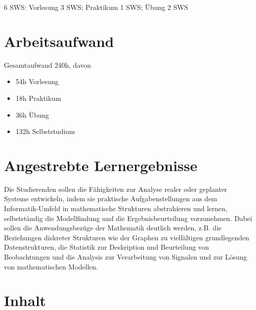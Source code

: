 6 SWS: Vorlesung 3 SWS; Praktikum 1 SWS; Übung 2 SWS

\hypertarget{arbeitsaufwandpathlabelmi-2017modulbeschreibungen-bachelorba_mathematik2}{%
\section*{Arbeitsaufwand\label{/mi-2017/modulbeschreibungen-bachelor/BA_Mathematik2}}\label{arbeitsaufwandpathlabelmi-2017modulbeschreibungen-bachelorba_mathematik2}}

Gesamtaufwand 240h, davon

\begin{itemize}
\tightlist
\item
  54h Vorlesung
\item
  18h Praktikum
\item
  36h Übung
\item
  132h Selbststudium
\end{itemize}

\hypertarget{angestrebte-lernergebnissepathlabelmi-2017modulbeschreibungen-bachelorba_mathematik2}{%
\section*{Angestrebte
Lernergebnisse\label{/mi-2017/modulbeschreibungen-bachelor/BA_Mathematik2}}\label{angestrebte-lernergebnissepathlabelmi-2017modulbeschreibungen-bachelorba_mathematik2}}

Die Studierenden sollen die Fähigkeiten zur Analyse realer oder
geplanter Systeme entwickeln, indem sie praktische Aufgabenstellungen
aus dem Informatik-Umfeld in mathematische Strukturen abstrahieren und
lernen, selbstständig die Modellfindung und die Ergebnisbeurteilung
vorzunehmen. Dabei sollen die Anwendungsbezüge der Mathematik deutlich
werden, z.B. die Beziehungen diskreter Strukturen wie der Graphen zu
vielfältigen grundlegenden Datenstrukturen, die Statistik zur
Deskription und Beurteilung von Beobachtungen und die Analysis zur
Verarbeitung von Signalen und zur Lösung von mathematischen Modellen.

\hypertarget{inhaltpathlabelmi-2017modulbeschreibungen-bachelorba_mathematik2}{%
\section*{Inhalt\label{/mi-2017/modulbeschreibungen-bachelor/BA_Mathematik2}}\label{inhaltpathlabelmi-2017modulbeschreibungen-bachelorba_mathematik2}}

